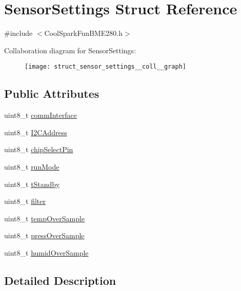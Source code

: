 \hypertarget{struct_sensor_settings}{}\section{Sensor\+Settings Struct Reference}
\label{struct_sensor_settings}


{\ttfamily \#include $<$Cool\+Spark\+Fun\+B\+M\+E280.\+h$>$}



Collaboration diagram for Sensor\+Settings\+:
\nopagebreak
\begin{figure}[H]
\begin{center}
\leavevmode
\texttt{[image: struct\_sensor\_settings\_\_coll\_\_graph]}
\end{center}
\end{figure}
\subsection*{Public Attributes}
\begin{DoxyCompactItemize}
\item 
uint8\+\_\+t \hyperlink{struct_sensor_settings_a5bf116387c543a6ea5732976424e8cb1}{comm\+Interface}
\item 
uint8\+\_\+t \hyperlink{struct_sensor_settings_af8103021dbce7e5ee6d786c4893324f7}{I2\+C\+Address}
\item 
uint8\+\_\+t \hyperlink{struct_sensor_settings_abe2de606ebb580ad81e3fafb1a454580}{chip\+Select\+Pin}
\item 
uint8\+\_\+t \hyperlink{struct_sensor_settings_a0ffbdf34f4c23a2a167f00e4cb971dec}{run\+Mode}
\item 
uint8\+\_\+t \hyperlink{struct_sensor_settings_a7098be3c1df0271dc9bc0fb45c1e9bb9}{t\+Standby}
\item 
uint8\+\_\+t \hyperlink{struct_sensor_settings_a69dc95368069a0f408a141d4c2cbf045}{filter}
\item 
uint8\+\_\+t \hyperlink{struct_sensor_settings_abdedc9d05f4850c58005313486958073}{temp\+Over\+Sample}
\item 
uint8\+\_\+t \hyperlink{struct_sensor_settings_a85ba10cad25b479bba9cb42c6400ab21}{press\+Over\+Sample}
\item 
uint8\+\_\+t \hyperlink{struct_sensor_settings_a4a02fc7708071b88ccf610e3f7ed9d55}{humid\+Over\+Sample}
\end{DoxyCompactItemize}


\subsection{Detailed Description}


